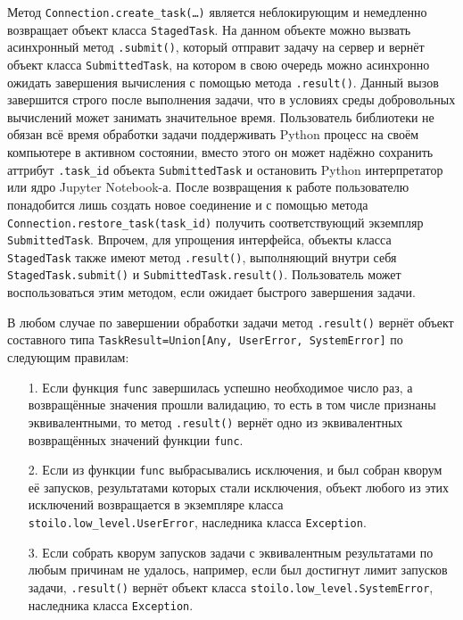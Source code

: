 \documentclass[a4paper,12pt]{extarticle}
\begin{document}
Метод \texttt{Connection.create\_task(\ldots)} является неблокирующим и немедленно возвращает объект класса \texttt{StagedTask}. На данном объекте можно вызвать асинхронный метод \texttt{.submit()}, который отправит задачу на сервер и вернёт объект класса \texttt{SubmittedTask}, на котором в свою очередь можно асинхронно ожидать завершения вычисления с помощью метода \texttt{.result()}. Данный вызов завершится строго после выполнения задачи, что в условиях среды добровольных вычислений может занимать значительное время. Пользователь библиотеки не обязан всё время обработки задачи поддерживать Python процесс на своём компьютере в активном состоянии, вместо этого он может надёжно сохранить аттрибут \texttt{.task\_id} объекта \texttt{SubmittedTask} и остановить Python интерпретатор или ядро Jupyter Notebook-а. После возвращения к работе пользователю понадобится лишь создать новое соединение и с помощью метода \texttt{Connection.restore\_task(task\_id)} получить соответствующий экземпляр \texttt{SubmittedTask}.
Впрочем, для упрощения интерфейса, объекты класса \texttt{StagedTask} также имеют метод \texttt{.result()}, выполняющий внутри себя \texttt{StagedTask.submit()} и \texttt{SubmittedTask.result()}. Пользователь может воспользоваться этим методом, если ожидает быстрого завершения задачи.

В любом случае по завершении обработки задачи метод \texttt{.result()} вернёт объект составного типа \texttt{TaskResult=Union[Any, UserError, SystemError]} по следующим правилам:
\begin{enumerate}
    \item[1.] Если функция \texttt{func} завершилась успешно необходимое число раз, а возвращённые значения прошли валидацию, то есть в том числе признаны эквивалентными, то метод \texttt{.result()} вернёт одно из эквивалентных возвращённых значений функции \texttt{func}.
    \item[2.] Если из функции \texttt{func} выбрасывались исключения, и был собран кворум её запусков, результатами которых стали исключения, объект любого из этих исключений возвращается в экземпляре класса \texttt{stoilo.low\_level.UserError}, наследника класса \texttt{Exception}.
    \item[3.] Если собрать кворум запусков задачи с эквивалентным результатами по любым причинам не удалось, например, если был достигнут лимит запусков задачи, \texttt{.result()} вернёт объект класса \texttt{stoilo.low\_level.SystemError}, наследника класса \texttt{Exception}.
\end{enumerate}
\end{document}
